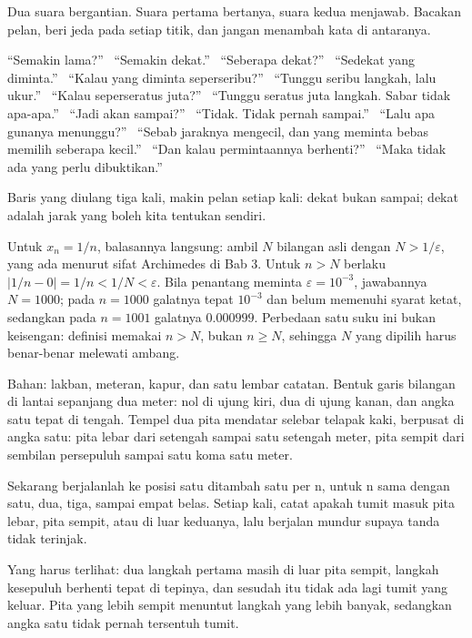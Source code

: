 \begin{bacakeras}
Dua suara bergantian. Suara pertama bertanya, suara kedua menjawab. Bacakan pelan,
beri jeda pada setiap titik, dan jangan menambah kata di antaranya.

``Semakin lama?'' \ ``Semakin dekat.'' \ ``Seberapa dekat?'' \ ``Sedekat yang
diminta.'' \ ``Kalau yang diminta seperseribu?'' \ ``Tunggu seribu langkah, lalu
ukur.'' \ ``Kalau seperseratus juta?'' \ ``Tunggu seratus juta langkah. Sabar tidak
apa-apa.'' \ ``Jadi akan sampai?'' \ ``Tidak. Tidak pernah sampai.'' \ ``Lalu apa
gunanya menunggu?'' \ ``Sebab jaraknya mengecil, dan yang meminta bebas memilih
seberapa kecil.'' \ ``Dan kalau permintaannya berhenti?'' \ ``Maka tidak ada yang
perlu dibuktikan.''

Baris yang diulang tiga kali, makin pelan setiap kali: dekat bukan sampai; dekat
adalah jarak yang boleh kita tentukan sendiri.
\end{bacakeras}

Untuk $x_n=1/n$, balasannya langsung: ambil $N$ bilangan asli dengan $N>1/\varepsilon$,
yang ada menurut sifat Archimedes di Bab 3. Untuk $n>N$ berlaku
$|1/n-0|=1/n<1/N<\varepsilon$. Bila penantang meminta $\varepsilon=10^{-3}$,
jawabannya $N=1000$; pada $n=1000$ galatnya tepat $10^{-3}$ dan belum memenuhi
syarat ketat, sedangkan pada $n=1001$ galatnya $0.000999$. Perbedaan satu suku ini
bukan keisengan: definisi memakai $n>N$, bukan $n \ge N$, sehingga $N$ yang dipilih
harus benar-benar melewati ambang.

\begin{tangan}
Bahan: lakban, meteran, kapur, dan satu lembar catatan. Bentuk garis bilangan di
lantai sepanjang dua meter: nol di ujung kiri, dua di ujung kanan, dan angka satu
tepat di tengah. Tempel dua pita mendatar selebar telapak kaki, berpusat di angka
satu: pita lebar dari setengah sampai satu setengah meter, pita sempit dari sembilan
persepuluh sampai satu koma satu meter.

Sekarang berjalanlah ke posisi satu ditambah satu per n, untuk n sama dengan satu,
dua, tiga, sampai empat belas. Setiap kali, catat apakah tumit masuk pita lebar,
pita sempit, atau di luar keduanya, lalu berjalan mundur supaya tanda tidak
terinjak.

Yang harus terlihat: dua langkah pertama masih di luar pita sempit, langkah
kesepuluh berhenti tepat di tepinya, dan sesudah itu tidak ada lagi tumit yang
keluar. Pita yang lebih sempit menuntut langkah yang lebih banyak, sedangkan angka
satu tidak pernah tersentuh tumit.
\end{tangan}

